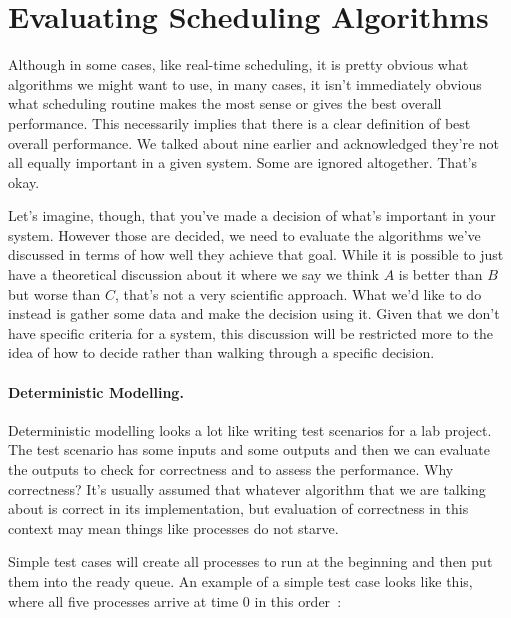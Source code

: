 




\section*{Evaluating Scheduling Algorithms}

Although in some cases, like real-time scheduling, it is pretty obvious what algorithms we might want to use, in many cases, it isn't immediately obvious what scheduling routine makes the most sense or gives the best overall performance. This necessarily implies that there is a clear definition of best overall performance. We talked about nine earlier and acknowledged they're not all equally important in a given system. Some are ignored altogether. That's okay.

Let's imagine, though, that you've made a decision of what's important in your system. However those are decided, we need to evaluate the algorithms we've discussed in terms of how well they achieve that goal. While it is possible to just have a theoretical discussion about it where we say we think $A$ is better than $B$ but worse than $C$, that's not a very scientific approach. What we'd like to do instead is gather some data and make the decision using it. Given that we don't have specific criteria for a system, this discussion will be restricted more to the idea of how to decide rather than walking through a specific decision. 

\paragraph{Deterministic Modelling.}

Deterministic modelling looks a lot like writing test scenarios for a lab project. The test scenario has some inputs and some outputs and then we can evaluate the outputs to check for correctness and to assess the performance.  Why correctness? It's usually assumed that whatever algorithm that we are talking about is correct in its implementation, but evaluation of correctness in this context may mean things like processes do not starve.

Simple test cases will create all processes to run at the beginning and then put them into the ready queue. An example of a simple test case looks like this, where all five processes arrive at time 0 in this order~\cite{osc}:

